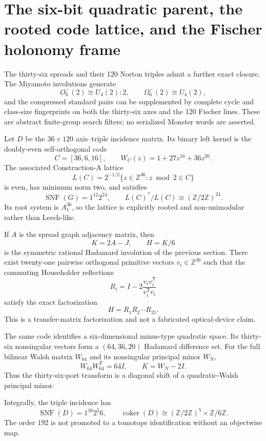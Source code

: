 \section{The six-bit quadratic parent, the rooted code lattice, and the Fischer holonomy frame}
\label{sec:bt3751-3758-monster-lattice-multiport-cover}

The thirty-six spreads and their 120 Norton triples admit a further exact closure. The Miyamoto involutions generate
\[
O^-_6(2)\cong U_4(2){:}2,
\qquad
\Omega^-_6(2)\cong U_4(2),
\]
and the compressed standard pairs can be supplemented by complete cycle and class-size fingerprints on both the thirty-six axes and the 120 Fischer lines. These are abstract finite-group search filters; no serialized Monster words are asserted.

Let $D$ be the $36\times120$ axis--triple incidence matrix. Its binary left kernel is the doubly-even self-orthogonal code
\[
C=[36,6,16],
\qquad W_C(z)=1+27z^{16}+36z^{20}.
\]
The associated Construction-A lattice
\[
L(C)=2^{-1/2}\{z\in\mathbb Z^{36}:z\bmod2\in C\}
\]
is even, has minimum norm two, and satisfies
\[
\operatorname{SNF}(G)=1^{12}2^{24},
\qquad L(C)^*/L(C)\cong(\mathbb Z/2\mathbb Z)^{24}.
\]
Its root system is $A_1^{36}$, so the lattice is explicitly rooted and non-unimodular rather than Leech-like.

If $A$ is the spread graph adjacency matrix, then
\[
K=2A-J,
\qquad H=K/6
\]
is the symmetric rational Hadamard involution of the previous section. There exist twenty-one pairwise orthogonal primitive vectors $v_i\in\mathbb Z^{36}$ such that the commuting Householder reflections
\[
R_i=I-2\frac{v_iv_i^{\mathsf T}}{v_i^{\mathsf T}v_i}
\]
satisfy the exact factorization
\[
H=R_1R_2\cdots R_{21}.
\]
This is a transfer-matrix factorization and not a fabricated optical-device claim.

The same code identifies a six-dimensional minus-type quadratic space. Its thirty-six nonsingular vectors form a $(64,36,20)$ Hadamard difference set. For the full bilinear Walsh matrix $W_{64}$ and its nonsingular principal minor $W_N$,
\[
W_{64}W_{64}^{\mathsf T}=64I,
\qquad K=W_N-2I.
\]
Thus the thirty-six-port transform is a diagonal shift of a quadratic-Walsh principal minor.

Integrally, the triple incidence has
\[
\operatorname{SNF}(D)=1^{30}2^5 6,
\qquad
\operatorname{coker}(D)\cong(\mathbb Z/2\mathbb Z)^5\times\mathbb Z/6\mathbb Z.
\]
The order $192$ is not promoted to a tomotope identification without an objectwise map.


